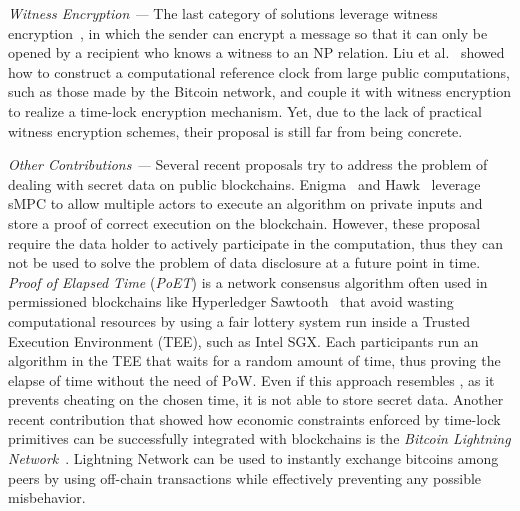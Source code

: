 {\em Witness Encryption ---} The last category of solutions leverage witness encryption~\cite{Garg:2013:WEA:2488608.2488667}, in which the sender can encrypt a message so that it can only be opened by a recipient who knows a witness to an NP relation. Liu et al.~\cite{jager2018} showed how to construct a computational reference clock from large public computations, such as those made by the Bitcoin network, and couple it with witness encryption to realize a time-lock encryption mechanism. Yet, due to the lack of practical witness encryption schemes, their proposal is still far from being concrete.

{\em Other Contributions ---}
Several recent proposals try to address the problem of dealing with secret data on public blockchains. Enigma~\cite{enigma} and Hawk~\cite{hawk} leverage sMPC to allow multiple actors to execute an algorithm on private inputs and store a proof of correct execution on the blockchain.
However, these proposal require the data holder to actively participate in the computation, thus they can not be used to solve the problem of data disclosure at a future point in time.
%
{\em Proof of Elapsed Time} ({\em PoET}) is a network consensus algorithm often used in permissioned blockchains like Hyperledger Sawtooth~\cite{poet,hyperledger-sawtooth} that avoid wasting computational resources by using a fair lottery system run inside a Trusted Execution Environment (TEE), such as Intel SGX. Each participants run an algorithm in the TEE that waits for a random amount of time, thus proving the elapse of time without the need of PoW. Even if this approach resembles \shortname, as it prevents cheating on the chosen time, it is not able to store secret data.
%
Another recent contribution that showed how economic constraints enforced by time-lock primitives can be successfully integrated with blockchains is the {\em Bitcoin Lightning Network}~\cite{poon2016bitcoin}. Lightning Network can be used to instantly exchange bitcoins among peers by using off-chain transactions while effectively preventing any possible misbehavior.
